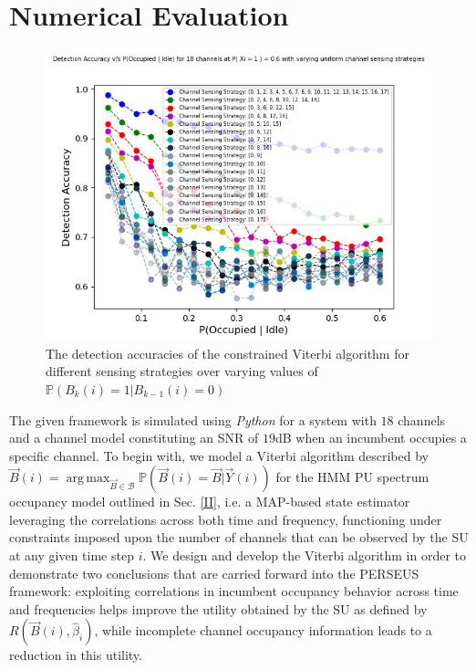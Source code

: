 \documentclass[10pt,twocolumn]{IEEEtran}
\DeclareMathOperator*{\argmax}{arg\,max}
\begin{document}
\section{Numerical Evaluation}\label{IV}
\begin{figure}
    \centering
    \includegraphics[width=0.95\linewidth]{ViterbiDetectionAccuracies.png}
    \caption{The detection accuracies of the constrained Viterbi algorithm for different sensing strategies over varying values of $\mathbb{P}(B_{k}(i){=}1|B_{k-1}(i){=}0)$}
    \label{fig:2}
\end{figure}

The given framework is simulated using \emph{Python} for a system with $18$ channels and a channel model constituting an SNR of $19$dB when an incumbent occupies a specific channel. To begin with, we model a Viterbi algorithm described by $\vec{B}(i){=}\argmax_{\vec{B}{\in}\mathcal{B}} \mathbb{P}(\vec{B}(i){=}\vec{B}|\vec{Y}(i))$ for the HMM PU spectrum occupancy model outlined in Sec. \ref{II}, i.e. a MAP-based state estimator leveraging the correlations across both time and frequency, functioning under constraints imposed upon the number of channels that can be observed by the SU at any given time step $i$. We design and develop the Viterbi algorithm in order to demonstrate two conclusions that are carried forward into the PERSEUS framework: exploiting correlations in incumbent occupancy behavior across time and frequencies helps improve the utility obtained by the SU as defined by $R(\vec{B}(i), \hat{\beta}_{i})$, while incomplete channel occupancy information leads to a reduction in this utility. 
\end{document}
